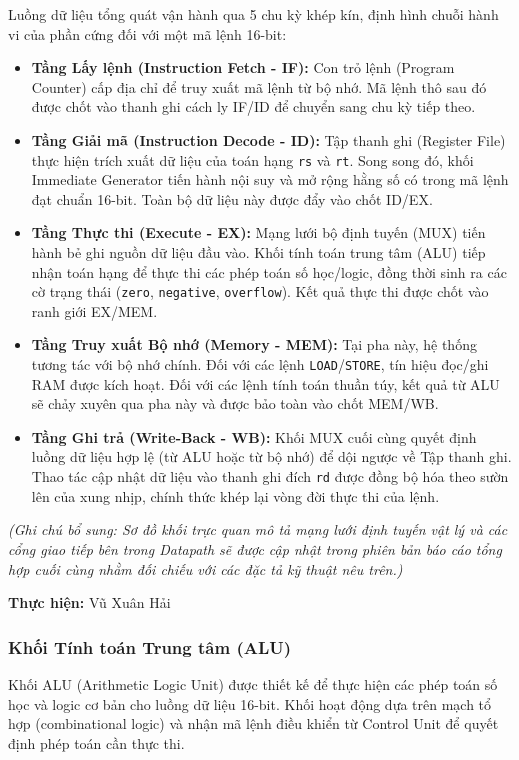 \documentclass[11pt,a4paper]{article}
\theoremstyle{definition}
\theoremstyle{remark}
\begin{document}
	Luồng dữ liệu tổng quát vận hành qua 5 chu kỳ khép kín, định hình chuỗi hành vi của phần cứng đối với một mã lệnh 16-bit:
	\begin{itemize}
		\item \textbf{Tầng Lấy lệnh (Instruction Fetch - IF):} Con trỏ lệnh (Program Counter) cấp địa chỉ để truy xuất mã lệnh từ bộ nhớ. Mã lệnh thô sau đó được chốt vào thanh ghi cách ly IF/ID để chuyển sang chu kỳ tiếp theo.
		\item \textbf{Tầng Giải mã (Instruction Decode - ID):} Tập thanh ghi (Register File) thực hiện trích xuất dữ liệu của toán hạng \texttt{rs} và \texttt{rt}. Song song đó, khối Immediate Generator tiến hành nội suy và mở rộng hằng số có trong mã lệnh đạt chuẩn 16-bit. Toàn bộ dữ liệu này được đẩy vào chốt ID/EX.
		\item \textbf{Tầng Thực thi (Execute - EX):} Mạng lưới bộ định tuyến (MUX) tiến hành bẻ ghi nguồn dữ liệu đầu vào. Khối tính toán trung tâm (ALU) tiếp nhận toán hạng để thực thi các phép toán số học/logic, đồng thời sinh ra các cờ trạng thái (\texttt{zero}, \texttt{negative}, \texttt{overflow}). Kết quả thực thi được chốt vào ranh giới EX/MEM.
		\item \textbf{Tầng Truy xuất Bộ nhớ (Memory - MEM):} Tại pha này, hệ thống tương tác với bộ nhớ chính. Đối với các lệnh \texttt{LOAD}/\texttt{STORE}, tín hiệu đọc/ghi RAM được kích hoạt. Đối với các lệnh tính toán thuần túy, kết quả từ ALU sẽ chảy xuyên qua pha này và được bảo toàn vào chốt MEM/WB.
		\item \textbf{Tầng Ghi trả (Write-Back - WB):} Khối MUX cuối cùng quyết định luồng dữ liệu hợp lệ (từ ALU hoặc từ bộ nhớ) để dội ngược về Tập thanh ghi. Thao tác cập nhật dữ liệu vào thanh ghi đích \texttt{rd} được đồng bộ hóa theo sườn lên của xung nhịp, chính thức khép lại vòng đời thực thi của lệnh.
	\end{itemize}
	
	
	
	\textit{(Ghi chú bổ sung: Sơ đồ khối trực quan mô tả mạng lưới định tuyến vật lý và các cổng giao tiếp bên trong Datapath sẽ được cập nhật trong phiên bản báo cáo tổng hợp cuối cùng nhằm đối chiếu với các đặc tả kỹ thuật nêu trên.)}
	
	\textbf{Thực hiện:} Vũ Xuân Hải
	
	\subsubsection{Khối Tính toán Trung tâm (ALU)}
	Khối ALU (Arithmetic Logic Unit) được thiết kế để thực hiện các phép toán số học và logic cơ bản cho luồng dữ liệu 16-bit. Khối hoạt động dựa trên mạch tổ hợp (combinational logic) và nhận mã lệnh điều khiển từ Control Unit để quyết định phép toán cần thực thi.
	
\end{document}
